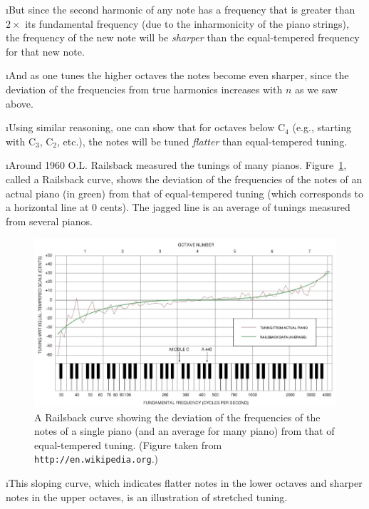 \i But since the second harmonic of any note has 
a frequency that is greater than $2\times$ its
fundamental frequency (due to the inharmonicity of
the piano strings), the frequency of the new note
will be {\em sharper} than the 
equal-tempered frequency for that new note.

\i And as one tunes the higher octaves the notes
become even sharper, since the deviation of the
frequencies from true harmonics
increases with $n$ as we saw above.

\i Using similar reasoning, one can show that for 
octaves below C${}_4$ (e.g., starting with 
C${}_3$, C${}_2$, etc.), 
the notes will be tuned {\em flatter} than
equal-tempered tuning.

\i Around 1960 O.L. Railsback measured the tunings 
of many pianos.
Figure~\ref{f:Railsback}, called a Railsback
curve, shows the deviation of the frequencies of 
the notes of an actual piano (in green) from that 
of equal-tempered tuning (which corresponds to 
a horizontal line at 0 cents).
The jagged line is an average of tunings measured
from several pianos.
%
\begin{figure}[!htbp]
\begin{center}
\includegraphics[width=\textwidth]{Railsback.jpg}
\caption{A Railsback curve showing the 
deviation of the frequencies of the notes of 
a single piano (and an average for many piano)
from that of equal-tempered tuning.
(Figure taken from 
{\tt http://en.wikipedia.org}.)}
\label{f:Railsback}
\end{center}
\end{figure}
%
\FloatBarrier

\i This sloping curve, which indicates flatter notes
in the lower octaves and sharper notes in the upper
octaves, is an illustration of stretched tuning.

\ei

